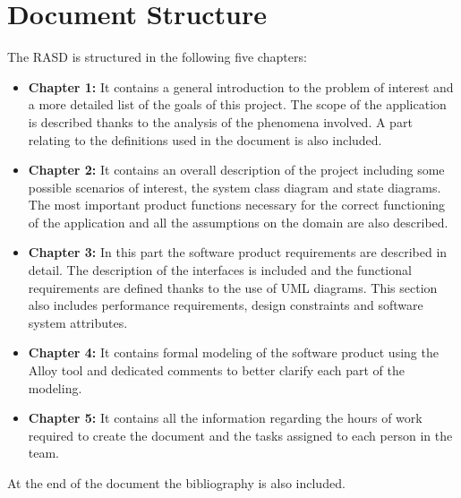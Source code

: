 \section{Document Structure}

The RASD is structured in the following five chapters:
\begin{itemize}
\item \textbf{Chapter 1:} It contains a general introduction to the problem of interest and a more detailed list of the goals of this project. The scope of the application is described thanks to the analysis of the phenomena involved.
A part relating to the definitions used in the document is also included.

\item \textbf{Chapter 2:} It contains an overall description of the project including some possible scenarios of interest, the system class diagram and state diagrams.
The most important product functions necessary for the correct functioning of the application and all the assumptions on the domain are also described.

\item \textbf{Chapter 3:} In this part the software product requirements are described in detail.
The description of the interfaces is included and the functional requirements are defined thanks to the use of UML diagrams.
This section also includes performance requirements, design constraints and software system attributes.

\item \textbf{Chapter 4:} It contains formal modeling of the software product using the Alloy tool and dedicated comments to better clarify each part of the modeling.

\item \textbf{Chapter 5:} It contains all the information regarding the hours of work required to create the document and the tasks assigned to each person in the team.
\end{itemize}

At the end of the document the bibliography is also included.
